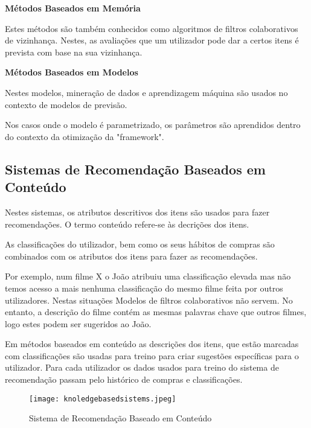 \begin{center}
\normalsize{\bfseries Métodos Baseados em Memória}\hfill
\end{center}
\par\hfill
 \par Estes métodos são também conhecidos como algoritmos de filtros colaborativos de vizinhança. Nestes, as avaliações que um utilizador pode dar a certos itens é prevista com base na sua vizinhança.\newline


\begin{center}
\normalsize{\bfseries Métodos Baseados em Modelos}\hfill
\end{center}
\par\hfill
\par Nestes modelos, mineração de dados e aprendizagem máquina são usados no contexto de modelos de previsão.
\par Nos casos onde o modelo é parametrizado, os parâmetros são aprendidos dentro do contexto da otimização da "framework".


\subsection{Sistemas de Recomendação Baseados em Conteúdo}
\par\hfill
\par Nestes sistemas, os atributos descritivos dos itens são usados para fazer recomendações. O termo conteúdo refere-se às decrições dos itens. 
\par As classificações do utilizador, bem como os seus hábitos de compras são combinados com os atributos dos itens para fazer as recomendações. 
\par Por exemplo, num filme X o João atribuiu uma classificação elevada mas não temos acesso a mais nenhuma classificação do mesmo filme feita por outros utilizadores. Nestas situações Modelos de filtros colaborativos não servem. No entanto, a descrição do filme contém as mesmas palavras chave que outros filmes, logo estes podem ser sugeridos ao João.
\par Em métodos baseados em conteúdo as descrições dos itens, que estão marcadas com classificações são usadas para treino para criar sugestões específicas para o utilizador. Para cada utilizador os dados usados para treino do sistema de recomendação passam pelo histórico de compras e classificações.
\begin{figure}[H]
  \centering
    \texttt{[image: knoledgebasedsistems.jpeg]}
    \caption{Sistema de Recomendação Baseado em Conteúdo}
    \label{fig03}
\end{figure}


